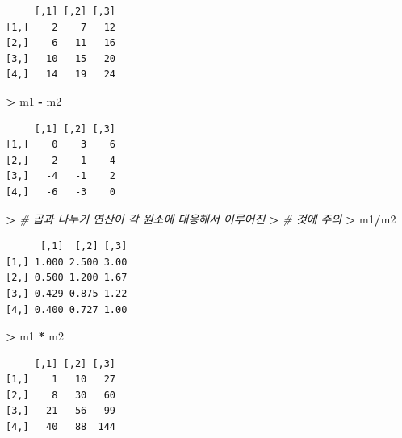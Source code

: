 \documentclass[12pt,a4paper]{book}
\newenvironment{Shaded}{\begin{snugshade}}{\end{snugshade}}
\newcommand{\KeywordTok}[1]{\textcolor[rgb]{0.13,0.29,0.53}{\textbf{#1}}}
\newcommand{\StringTok}[1]{\textcolor[rgb]{0.31,0.60,0.02}{#1}}
\newcommand{\CommentTok}[1]{\textcolor[rgb]{0.56,0.35,0.01}{\textit{#1}}}
\newcommand{\OperatorTok}[1]{\textcolor[rgb]{0.81,0.36,0.00}{\textbf{#1}}}
\newcommand{\ErrorTok}[1]{\textcolor[rgb]{0.64,0.00,0.00}{\textbf{#1}}}
\newcommand{\NormalTok}[1]{#1}
\theoremstyle{definition}
\theoremstyle{definition}
\theoremstyle{definition}
\theoremstyle{remark}
\begin{document}
\begin{verbatim}
     [,1] [,2] [,3]
[1,]    2    7   12
[2,]    6   11   16
[3,]   10   15   20
[4,]   14   19   24
\end{verbatim}

\begin{Shaded}
\begin{Highlighting}[]
\OperatorTok{>}\StringTok{ }\NormalTok{m1 }\OperatorTok{-}\StringTok{ }\NormalTok{m2}
\end{Highlighting}
\end{Shaded}

\begin{verbatim}
     [,1] [,2] [,3]
[1,]    0    3    6
[2,]   -2    1    4
[3,]   -4   -1    2
[4,]   -6   -3    0
\end{verbatim}

\begin{Shaded}
\begin{Highlighting}[]
\OperatorTok{>}\StringTok{ }\CommentTok{# 곱과 나누기 연산이 각 원소에 대응해서 이루어진}
\ErrorTok{>}\StringTok{ }\CommentTok{# 것에 주의}
\ErrorTok{>}\StringTok{ }\NormalTok{m1}\OperatorTok{/}\NormalTok{m2}
\end{Highlighting}
\end{Shaded}

\begin{verbatim}
      [,1]  [,2] [,3]
[1,] 1.000 2.500 3.00
[2,] 0.500 1.200 1.67
[3,] 0.429 0.875 1.22
[4,] 0.400 0.727 1.00
\end{verbatim}

\begin{Shaded}
\begin{Highlighting}[]
\OperatorTok{>}\StringTok{ }\NormalTok{m1 }\OperatorTok{*}\StringTok{ }\NormalTok{m2}
\end{Highlighting}
\end{Shaded}

\begin{verbatim}
     [,1] [,2] [,3]
[1,]    1   10   27
[2,]    8   30   60
[3,]   21   56   99
[4,]   40   88  144
\end{verbatim}

\begin{Shaded}
\end{Shaded}
\end{document}
